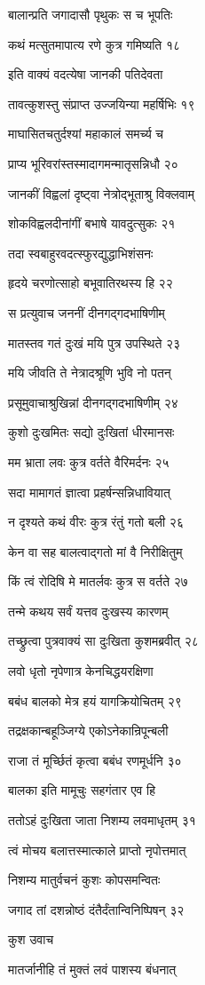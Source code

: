 बालान्प्रति जगादासौ पृथुकः स च भूपतिः

कथं मत्सुतमापात्य रणे कुत्र गमिष्यति १८

इति वाक्यं वदत्येषा जानकी पतिदेवता

तावत्कुशस्तु संप्राप्त उज्जयिन्या महर्षिभिः १९

माघासितचतुर्दश्यां महाकालं समर्च्य च

प्राप्य भूरिवरांस्तस्मादागमन्मातृसन्निधौ २०

जानकीं विह्वलां दृष्ट्वा नेत्रोद्भूताश्रु विक्लवाम्

शोकविह्वलदीनांगीं बभाषे यावदुत्सुकः २१

तदा स्वबाहुरवदत्स्फुरद्युद्धाभिशंसनः

हृदये चरणोत्साहो बभूवातिरथस्य हि २२

स प्रत्युवाच जननीं दीनगद्गदभाषिणीम्

मातस्तव गतं दुःखं मयि पुत्र उपस्थिते २३

मयि जीवति ते नेत्रादश्रूणि भुवि नो पतन्

प्रसूमुवाचाश्रुखिन्नां दीनगद्गदभाषिणीम् २४

कुशो दुःखमितः सद्यो दुःखितां धीरमानसः

मम भ्राता लवः कुत्र वर्तते वैरिमर्दनः २५

सदा मामागतं ज्ञात्वा प्रहर्षन्सन्निधावियात्

न दृश्यते कथं वीरः कुत्र रंतुं गतो बली २६

केन वा सह बालत्वाद्गतो मां वै निरीक्षितुम्

किं त्वं रोदिषि मे मातर्लवः कुत्र स वर्तते २७

तन्मे कथय सर्वं यत्तव दुःखस्य कारणम्

तच्छ्रुत्वा पुत्रवाक्यं सा दुःखिता कुशमब्रवीत् २८

लवो धृतो नृपेणात्र केनचिद्धयरक्षिणा

बबंध बालको मेत्र हयं यागक्रियोचितम् २९

तद्रक्षकान्बहूञ्जिग्ये एकोऽनेकान्रिपून्बली

राजा तं मूर्च्छितं कृत्वा बबंध रणमूर्धनि ३०

बालका इति मामूचुः सहगंतार एव हि

ततोऽहं दुःखिता जाता निशम्य लवमाधृतम् ३१

त्वं मोचय बलात्तस्मात्काले प्राप्तो नृपोत्तमात्

निशम्य मातुर्वचनं कुशः कोपसमन्वितः

जगाद तां दशन्नोष्ठं दंतैर्दंतान्विनिष्पिषन् ३२

कुश उवाच

मातर्जानीहि तं मुक्तं लवं पाशस्य बंधनात्

